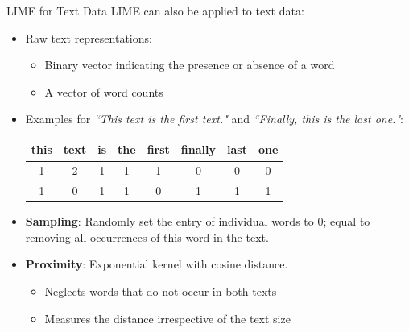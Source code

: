 \documentclass[10pt,compress,t,notes=noshow, xcolor=table]{beamer}
\begin{document}
%
%
%

\begin{frame}{LIME for Text Data }
    LIME can also be applied to text data: 
	\begin{itemize}
		\item Raw text representations: 
		\begin{itemize}
		    \item Binary vector indicating the presence or absence of a word 
		    \item A vector of word counts
		\end{itemize}
		\item Examples for \textit{``This text is the first text."} and \textit{``Finally, this is the last one."}:
		\begin{center}
			\begin{tabular}{c|c|c|c|c|c|c|c} 
				this & text & is & the & first & finally & last & one \\ 
				\hline
				1 & 2 & 1 & 1 & 1 & 0 & 0 & 0 \\
				1 & 0 & 1 & 1 & 0 & 1 & 1 & 1 \\
			\end{tabular}
		\end{center} 
		\item \textbf{Sampling}: Randomly set the entry of individual words to $0$; equal to removing all occurrences of this word in the text. 
		\item \textbf{Proximity}: Exponential kernel with cosine distance. 
		\begin{itemize}
		    \item Neglects words that do not occur in both texts 
		    \item Measures the distance irrespective of the text size
		\end{itemize}
	\end{itemize}
\end{frame}
	
\end{document}
